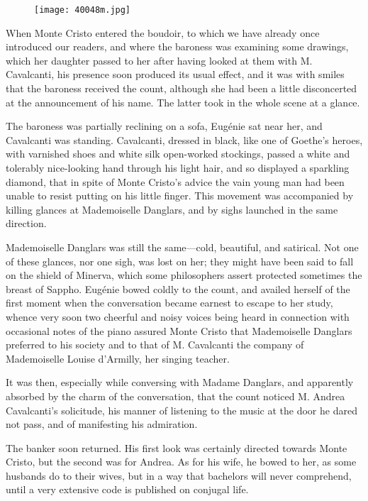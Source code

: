 \begin{figure}[ht]
\texttt{[image: 40048m.jpg]}
\end{figure}

When Monte Cristo entered the boudoir, to which we have already once
introduced our readers, and where the baroness was examining some
drawings, which her daughter passed to her after having looked at them
with M. Cavalcanti, his presence soon produced its usual effect, and it
was with smiles that the baroness received the count, although she had
been a little disconcerted at the announcement of his name. The latter
took in the whole scene at a glance.

The baroness was partially reclining on a sofa, Eugénie sat near her,
and Cavalcanti was standing. Cavalcanti, dressed in black, like one of
Goethe’s heroes, with varnished shoes and white silk open-worked
stockings, passed a white and tolerably nice-looking hand through his
light hair, and so displayed a sparkling diamond, that in spite of
Monte Cristo’s advice the vain young man had been unable to resist
putting on his little finger. This movement was accompanied by killing
glances at Mademoiselle Danglars, and by sighs launched in the same
direction.

Mademoiselle Danglars was still the same—cold, beautiful, and
satirical. Not one of these glances, nor one sigh, was lost on her;
they might have been said to fall on the shield of Minerva, which some
philosophers assert protected sometimes the breast of Sappho. Eugénie
bowed coldly to the count, and availed herself of the first moment when
the conversation became earnest to escape to her study, whence very
soon two cheerful and noisy voices being heard in connection with
occasional notes of the piano assured Monte Cristo that Mademoiselle
Danglars preferred to his society and to that of M. Cavalcanti the
company of Mademoiselle Louise d’Armilly, her singing teacher.

It was then, especially while conversing with Madame Danglars, and
apparently absorbed by the charm of the conversation, that the count
noticed M. Andrea Cavalcanti’s solicitude, his manner of listening to
the music at the door he dared not pass, and of manifesting his
admiration.

The banker soon returned. His first look was certainly directed towards
Monte Cristo, but the second was for Andrea. As for his wife, he bowed
to her, as some husbands do to their wives, but in a way that bachelors
will never comprehend, until a very extensive code is published on
conjugal life.

